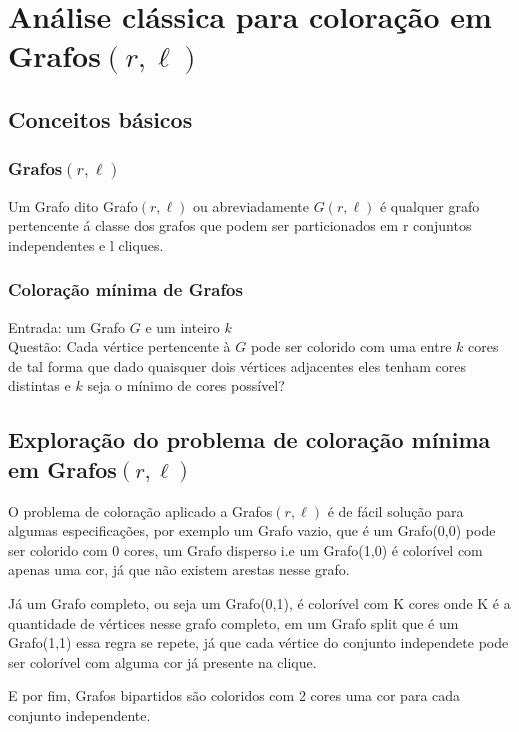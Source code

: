 \chapter{Análise clássica para coloração em Grafos$(r,\ell)$}
\section{Conceitos básicos}
    \subsection{Grafos$(r,\ell)$}
     \begin{definition}
         Um Grafo dito Grafo$(r,\ell)$ ou abreviadamente $G(r,\ell)$ é qualquer grafo pertencente á classe dos grafos que podem ser particionados em r conjuntos independentes e l cliques.
     \end{definition}
    \subsection{Coloração mínima de Grafos}
     \begin{definition}
         Entrada: um Grafo $G$ e um inteiro $k$\\
  Questão: Cada vértice pertencente à $G$ pode ser colorido com uma entre $k$ cores
  de tal forma que dado quaisquer dois vértices adjacentes eles tenham cores distintas e $k$ seja o mínimo de cores possível?
     \end{definition}

\section{Exploração do problema de coloração mínima em Grafos$(r,\ell)$}
    O problema de coloração aplicado a Grafos$(r,\ell)$ é de fácil solução para algumas especificações,
por exemplo um Grafo vazio, que é um Grafo(0,0) pode ser colorido com 0 cores, um Grafo disperso i.e um Grafo(1,0) é colorível com apenas uma cor, já que não existem arestas nesse grafo.

Já um Grafo completo, ou seja um Grafo(0,1), é colorível com K cores onde K é a quantidade de vértices nesse grafo completo, em um Grafo split que é um Grafo(1,1) essa regra se repete, já que cada vértice do conjunto independete pode ser colorível com alguma cor já presente na clique.

E por fim, Grafos bipartidos são coloridos com 2 cores uma cor para cada conjunto independente.

